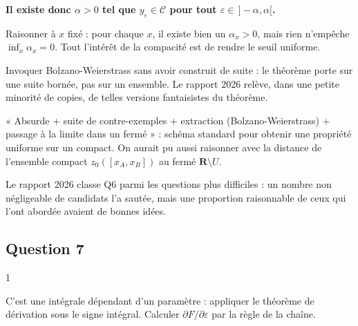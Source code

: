 \documentclass[11pt,a4paper]{article}
\begin{document}
\textbf{Il existe donc \(\alpha>0\) tel que \(y_\varepsilon\in\mathcal C\) pour tout \(\varepsilon\in\,]-\alpha,\alpha[\).}

\begin{piege}

Raisonner à \(x\) fixé : pour chaque \(x\), il existe bien un \(\alpha_x>0\), mais rien n'empêche \(\inf_x\alpha_x=0\). Tout l'intérêt de la compacité est de rendre le seuil uniforme.

\end{piege}

\begin{piege}

Invoquer Bolzano-Weierstrass sans avoir construit de suite : le théorème porte sur une suite bornée, pas sur un ensemble. Le rapport 2026 relève, dans une petite minorité de copies, de telles versions fantaisistes du théorème.

\end{piege}

\begin{methode}

« Absurde + suite de contre-exemples + extraction (Bolzano-Weierstrass) + passage à la limite dans un fermé » : schéma standard pour obtenir une propriété uniforme sur un compact. On aurait pu aussi raisonner avec la distance de l'ensemble compact \(z_0([x_A,x_B])\) au fermé \(\mathbf R\setminus U\).

\end{methode}

\begin{jury}

Le rapport 2026 classe Q6 parmi les questions plus difficiles : un nombre non négligeable de candidats l'a sautée, mais une proportion raisonnable de ceux qui l'ont abordée avaient de bonnes idées.

\end{jury}

\hypertarget{question-7}{%
\subsection{Question 7}\label{question-7}}

\begin{indication}{1}

C'est une intégrale dépendant d'un paramètre : appliquer le théorème de dérivation sous le signe intégral. Calculer \(\partial F/\partial\varepsilon\) par la règle de la chaîne.

\end{indication}
\end{document}

